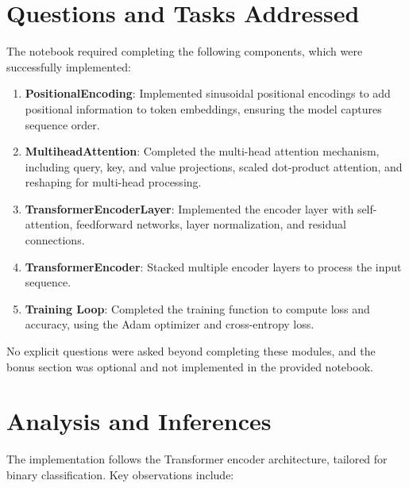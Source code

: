 \documentclass{article}
\begin{document}
\section{Questions and Tasks Addressed}
The notebook required completing the following components, which were successfully implemented:

\begin{enumerate}
    \item \textbf{PositionalEncoding}: Implemented sinusoidal positional encodings to add positional information to token embeddings, ensuring the model captures sequence order.
    \item \textbf{MultiheadAttention}: Completed the multi-head attention mechanism, including query, key, and value projections, scaled dot-product attention, and reshaping for multi-head processing.
    \item \textbf{TransformerEncoderLayer}: Implemented the encoder layer with self-attention, feedforward networks, layer normalization, and residual connections.
    \item \textbf{TransformerEncoder}: Stacked multiple encoder layers to process the input sequence.
    \item \textbf{Training Loop}: Completed the training function to compute loss and accuracy, using the Adam optimizer and cross-entropy loss.
\end{enumerate}

No explicit questions were asked beyond completing these modules, and the bonus section was optional and not implemented in the provided notebook.

\section{Analysis and Inferences}
The implementation follows the Transformer encoder architecture, tailored for binary classification. Key observations include:
\end{document}
